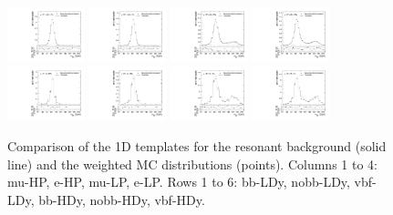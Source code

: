\begin{figure}[htbp]
  \includegraphics[width=0.2\textwidth]{fig/analysisAppendix/templateVsReco_res_r0_MJ_mu_HP_nobb_HDy.pdf}
  \includegraphics[width=0.2\textwidth]{fig/analysisAppendix/templateVsReco_res_r0_MJ_e_HP_nobb_HDy.pdf}
  \includegraphics[width=0.2\textwidth]{fig/analysisAppendix/templateVsReco_res_r0_MJ_mu_LP_nobb_HDy.pdf}
  \includegraphics[width=0.2\textwidth]{fig/analysisAppendix/templateVsReco_res_r0_MJ_e_LP_nobb_HDy.pdf}\\
  \includegraphics[width=0.2\textwidth]{fig/analysisAppendix/templateVsReco_res_r0_MJ_mu_HP_vbf_HDy.pdf}
  \includegraphics[width=0.2\textwidth]{fig/analysisAppendix/templateVsReco_res_r0_MJ_e_HP_vbf_HDy.pdf}
  \includegraphics[width=0.2\textwidth]{fig/analysisAppendix/templateVsReco_res_r0_MJ_mu_LP_vbf_HDy.pdf}
  \includegraphics[width=0.2\textwidth]{fig/analysisAppendix/templateVsReco_res_r0_MJ_e_LP_vbf_HDy.pdf}\\
  \caption{
    Comparison of the 1D \MJ templates for the resonant background (solid line) and the weighted MC distributions (points).
    Columns 1 to 4: mu-HP, e-HP, mu-LP, e-LP.
    Rows 1 to 6: bb-LDy, nobb-LDy, vbf-LDy, bb-HDy, nobb-HDy, vbf-HDy.
  }
  \label{fig:1dtemplateVsReco_res_MJ_Run2}
\end{figure}

